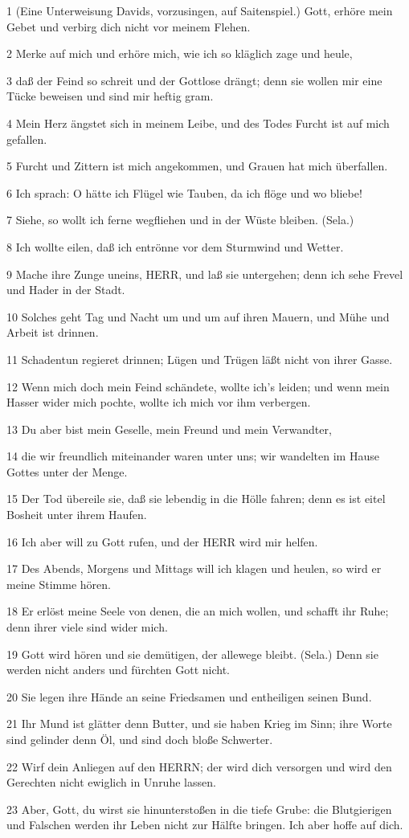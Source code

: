 \par 1 (Eine Unterweisung Davids, vorzusingen, auf Saitenspiel.) Gott, erhöre mein Gebet und verbirg dich nicht vor meinem Flehen.
\par 2 Merke auf mich und erhöre mich, wie ich so kläglich zage und heule,
\par 3 daß der Feind so schreit und der Gottlose drängt; denn sie wollen mir eine Tücke beweisen und sind mir heftig gram.
\par 4 Mein Herz ängstet sich in meinem Leibe, und des Todes Furcht ist auf mich gefallen.
\par 5 Furcht und Zittern ist mich angekommen, und Grauen hat mich überfallen.
\par 6 Ich sprach: O hätte ich Flügel wie Tauben, da ich flöge und wo bliebe!
\par 7 Siehe, so wollt ich ferne wegfliehen und in der Wüste bleiben. (Sela.)
\par 8 Ich wollte eilen, daß ich entrönne vor dem Sturmwind und Wetter.
\par 9 Mache ihre Zunge uneins, HERR, und laß sie untergehen; denn ich sehe Frevel und Hader in der Stadt.
\par 10 Solches geht Tag und Nacht um und um auf ihren Mauern, und Mühe und Arbeit ist drinnen.
\par 11 Schadentun regieret drinnen; Lügen und Trügen läßt nicht von ihrer Gasse.
\par 12 Wenn mich doch mein Feind schändete, wollte ich's leiden; und wenn mein Hasser wider mich pochte, wollte ich mich vor ihm verbergen.
\par 13 Du aber bist mein Geselle, mein Freund und mein Verwandter,
\par 14 die wir freundlich miteinander waren unter uns; wir wandelten im Hause Gottes unter der Menge.
\par 15 Der Tod übereile sie, daß sie lebendig in die Hölle fahren; denn es ist eitel Bosheit unter ihrem Haufen.
\par 16 Ich aber will zu Gott rufen, und der HERR wird mir helfen.
\par 17 Des Abends, Morgens und Mittags will ich klagen und heulen, so wird er meine Stimme hören.
\par 18 Er erlöst meine Seele von denen, die an mich wollen, und schafft ihr Ruhe; denn ihrer viele sind wider mich.
\par 19 Gott wird hören und sie demütigen, der allewege bleibt. (Sela.) Denn sie werden nicht anders und fürchten Gott nicht.
\par 20 Sie legen ihre Hände an seine Friedsamen und entheiligen seinen Bund.
\par 21 Ihr Mund ist glätter denn Butter, und sie haben Krieg im Sinn; ihre Worte sind gelinder denn Öl, und sind doch bloße Schwerter.
\par 22 Wirf dein Anliegen auf den HERRN; der wird dich versorgen und wird den Gerechten nicht ewiglich in Unruhe lassen.
\par 23 Aber, Gott, du wirst sie hinunterstoßen in die tiefe Grube: die Blutgierigen und Falschen werden ihr Leben nicht zur Hälfte bringen. Ich aber hoffe auf dich.

